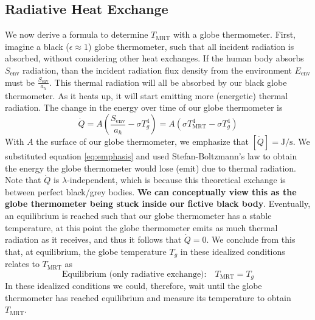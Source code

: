 \documentclass[]{scrartcl}
\begin{document}
\subsection{Radiative Heat Exchange}
We now derive a formula to determine $T_{\text{MRT}}$ with a globe thermometer. First, imagine a black ($\epsilon\approx1$) globe thermometer, such that all incident radiation is absorbed, without considering other heat exchanges. If the human body absorbs $S_{\text{env}}$ radiation, than the incident radiation flux density from the environment $E_{\text{env}}$ must be $\frac{S_{\text{env}}}{a_{h}}$. This thermal radiation will all be absorbed by our black globe thermometer. As it heats up, it will start emitting more (energetic) thermal radiation. The change in the energy over time of our globe thermometer is
\begin{equation}\label{eq:ideal}
	\boxed{\dot{Q} = A\left(\frac{S_{\text{env}}}{a_{h}} - \sigma T^4_g\right) = A\left(\sigma T^4_{\text{MRT}} - \sigma T^4_g\right)}
\end{equation}
With $A$ the surface of our globe thermometer, we emphasize that $\left[\dot{Q}\right] = \unit{\joule\per\second}$. We substituted equation \eqref{eq:emphasis} and used Stefan-Boltzmann's law to obtain the energy the globe thermometer would lose (emit) due to thermal radiation. Note that $\dot{Q}$ is $\lambda$-independent, which is because this theoretical exchange is between perfect black/grey bodies. \textbf{We can conceptually view this as the globe thermometer being stuck inside our fictive black body}. Eventually, an equilibrium is reached such that our globe thermometer has a stable temperature, at this point the globe thermometer emits as much thermal radiation as it receives, and thus it follows that $\dot{Q}=0$. We conclude from this that, at equilibrium, the globe temperature $T_g$ in these idealized conditions relates to $T_{\text{MRT}}$ as
\begin{equation}\label{eq:zeroth-condition}
	\text{Equilibrium (only radiative exchange):}\quad T_\text{MRT} = T_g
\end{equation}
In these idealized conditions we could, therefore, wait until the globe thermometer has reached equilibrium and measure its temperature to obtain $T_{\text{MRT}}$.
\\
\end{document}

